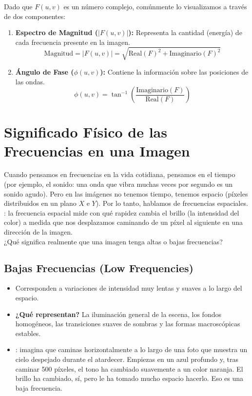 \noindent
Dado que $F(u,v)$ es un número complejo, comúnmente lo visualizamos a través de dos componentes:
\begin{enumerate}
    \item \textbf{Espectro de Magnitud ($|F(u,v)|$):} Representa la cantidad (energía) de cada frecuencia presente en la imagen. 
    $$\text{Magnitud} = |F(u,v)| = \sqrt{\text{Real}(F)^2 + \text{Imaginario}(F)^2}$$
    \item \textbf{Ángulo de Fase ($\phi(u,v)$):} Contiene la información sobre las posiciones de las ondas.
    $$\phi(u,v) = \tan^{-1} \left( \frac{\text{Imaginario}(F)}{\text{Real}(F)} \right)$$
\end{enumerate}

\section{Significado Físico de las Frecuencias en una Imagen}
Cuando pensamos en frecuencias en la vida cotidiana, pensamos en el tiempo (por ejemplo, el sonido: una onda que vibra muchas veces por segundo es un sonido agudo). Pero en las imágenes no tenemos tiempo, tenemos espacio (píxeles distribuidos en un plano $X$ e $Y$). Por lo tanto, hablamos de frecuencias espaciales.  \\

\noindent
{}: la frecuencia espacial mide con qué rapidez cambia el brillo (la intensidad del color) a medida que nos desplazamos caminando de un píxel al siguiente en una dirección de la imagen. \\

\noindent
¿Qué significa realmente que una imagen tenga altas o bajas frecuencias?

\subsection{Bajas Frecuencias (Low Frequencies)}
\begin{itemize}
    \item Corresponden a variaciones de intensidad muy lentas y suaves a lo largo del espacio.
    \item \textbf{¿Qué representan?} La iluminación general de la escena, los fondos homogéneos, las transiciones suaves de sombras y las formas macroscópicas estables.
    \item {}: imagina que caminas horizontalmente a lo largo de una foto que muestra un cielo despejado durante el atardecer. Empiezas en un azul profundo y, tras caminar 500 píxeles, el tono ha cambiado suavemente a un color naranja. El brillo ha cambiado, sí, pero le ha tomado mucho espacio hacerlo. Eso es una baja frecuencia.
\end{itemize}

